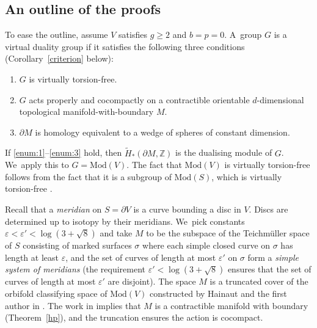 \documentclass[JEP,XML,SOM,Unicode,NoFloatCountersInSection,published]{cedram}
\theoremstyle{plain}
\theoremstyle{definition}
\let\eps\varepsilon
\newcommand{\Z}{\mathbb Z}
\newcommand{\mcg}{\mathrm{Mod}}
\newcommand{\hmod}{\mathrm{Mod}}
\begin{document}
\subsection{An outline of the proofs}

To ease the outline, assume $V$ satisfies $g\geq 2$ and $b=p=0$. A~group $G$ is a virtual duality group if it satisfies the following three conditions (Corollary~\ref{criterion} below):\enlargethispage{.5\baselineskip}
\begin{enumerate}
\item\label{enum:1} $G$ is virtually torsion-free.
\item\label{enum:2} $G$ acts properly and cocompactly on a contractible
orientable $d$-dimensional topological manifold-with-boundary $M$.
\item\label{enum:3} $\partial M$ is homology equivalent to a wedge of spheres of constant dimension.
\end{enumerate}
If \eqref{enum:1}--\eqref{enum:3} hold, then $\widetilde H_\ast(\partial M,\Z)$ is the dualising module of $G$. We~apply this to $G=\hmod(V)$. The fact that $\hmod(V)$ is virtually torsion-free follows from the fact that it is a subgroup of $\mcg(S)$, which is virtually torsion-free \cite[Th.\,6.9]{farbmargalit}.

Recall that a \emph{meridian} on $S=\partial V$ is a curve bounding a disc in $V$. Discs are determined up to isotopy by their meridians. We~pick constants $\eps < \eps ' < \log(3+\sqrt{8})$ and take $M$ to be the subspace of the Teichmüller space of $S$ consisting of marked surfaces $\sigma$ where each simple closed curve on $\sigma$ has length at least $\eps$, and the set of curves of length at most $\eps'$ on $\sigma$ form a \emph{simple system of meridians} (the requirement $\eps ' < \log(3+\sqrt{8})$ ensures that the set of curves of length at most $\eps'$ are disjoint). The space $M$ is a truncated cover of the orbifold classifying space of $\hmod(V)$ constructed by Hainaut and the first author in \cite{hainautpetersen}. The work in \cite{hainautpetersen} implies that $M$ is a contractible manifold with boundary (Theorem~\ref{hp}), and the truncation ensures the action is cocompact.
\end{document}
